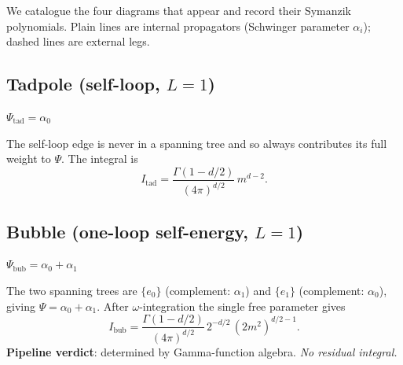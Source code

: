\documentclass[10pt,a4paper,twocolumn]{article}
\theoremstyle{plain}
\theoremstyle{definition}
\renewcommand{\Psi}{\varPsi}
\begin{document}
We catalogue the four diagrams that appear and record their
Symanzik polynomials.  Plain lines are internal propagators
(Schwinger parameter $\alpha_i$); dashed lines are external legs.

\subsection{Tadpole (self-loop, $L=1$)}

\begin{center}
\qquad\qquad
$\Psi_{\text{tad}} = \alpha_0$
\end{center}

The self-loop edge is never in a spanning tree and so always
contributes its full weight to $\Psi$.  The integral is
\begin{equation}\label{eq:Idad}
  I_{\text{tad}}
  = \frac{\Gamma(1-d/2)}{(4\pi)^{d/2}}\, m^{d-2}.
\end{equation}

\subsection{Bubble (one-loop self-energy, $L=1$)}

\begin{center}
\qquad\qquad
$\Psi_{\text{bub}} = \alpha_0 + \alpha_1$
\end{center}

The two spanning trees are $\{e_0\}$ (complement: $\alpha_1$) and
$\{e_1\}$ (complement: $\alpha_0$), giving $\Psi = \alpha_0 + \alpha_1$.
After $\omega$-integration the single free parameter gives
\begin{equation}\label{eq:Ibub}
  I_{\text{bub}}
  = \frac{\Gamma(1-d/2)}{(4\pi)^{d/2}}\,
    2^{-d/2}\,(2m^2)^{d/2-1}.
\end{equation}
\textbf{Pipeline verdict}: determined by Gamma-function algebra.
\emph{No residual integral.}
\end{document}
